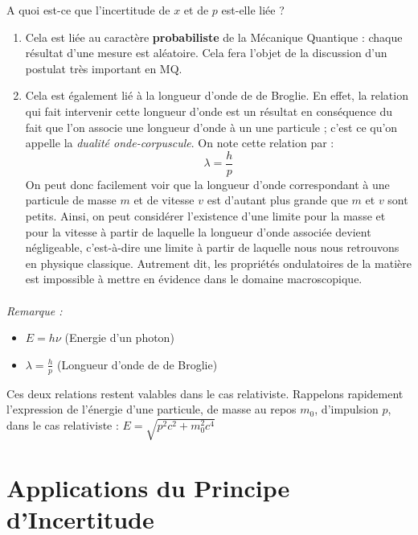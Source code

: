 \documentclass[../Notes de cours]{subfiles}
\begin{document}
A quoi est-ce que l'incertitude de $x$ et de $p$ est-elle liée ? 
\begin{enumerate}
    \item Cela est liée au caractère \textbf{probabiliste} de la Mécanique Quantique : chaque résultat d'une mesure est aléatoire. Cela fera l'objet de la discussion d'un postulat très important en MQ. 
    \item Cela est également lié à la longueur d'onde de de Broglie. En effet, la relation qui fait intervenir cette longueur d'onde est un résultat en conséquence du fait que l'on associe une longueur d'onde à un une particule ; c'est ce qu'on appelle la \textit{dualité onde-corpuscule}. 
    \newline On note cette relation par : 
    \begin{equation}
    \label{Broglie}
    \lambda = \frac{h}{p}
    \end{equation}
    \newline On peut donc facilement voir que la longueur d'onde correspondant à une particule de masse $m$ et de vitesse $v$ est d'autant plus grande que $m$ et $v$ sont petits. Ainsi, on peut considérer l'existence d'une limite pour la masse et pour la vitesse à partir de laquelle la longueur d'onde associée devient négligeable, c'est-à-dire une limite à partir de laquelle nous nous retrouvons en physique classique. Autrement dit, les propriétés ondulatoires de la matière est impossible à mettre en évidence dans le domaine macroscopique. 
\end{enumerate}

\paragraph{} \textit{Remarque :} \begin{itemize}[label=\textbullet]
    \item $E = h \nu$ (Energie d'un photon)
    \item $\lambda = \frac{h}{p}$ (Longueur d'onde de de Broglie)
\end{itemize}
Ces deux relations restent valables dans le cas relativiste. 
\newline Rappelons rapidement l'expression de l'énergie d'une particule, de masse au repos $m_0$, d'impulsion $p$, dans le cas relativiste : $E = \sqrt{p^2c^2 + m_0^2c^4}$

\section{Applications du Principe d'Incertitude}
\end{document}
